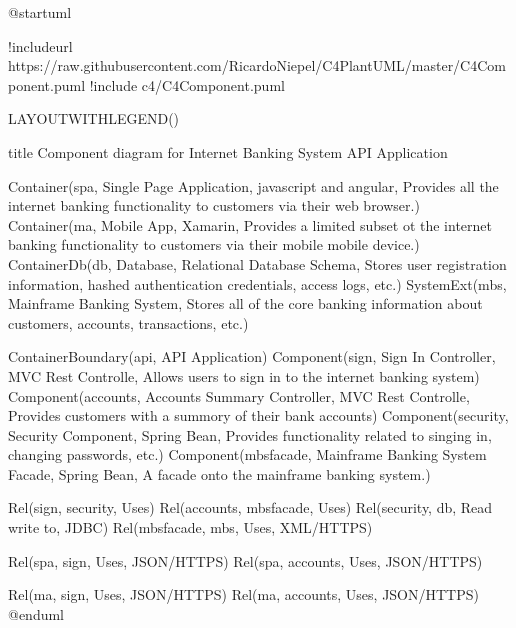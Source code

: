 \documentclass[letterpaper,10pt,english]{sphinxmanual}
\begin{document}
\begin{sphinxVerbatim}[commandchars=\\\{\},numbers=left,firstnumber=1,stepnumber=1]
@startuml

\PYGZsq{}!includeurl https://raw.githubusercontent.com/RicardoNiepel/C4\PYGZhy{}PlantUML/master/C4\PYGZus{}Component.puml
!include \PYGZlt{}c4/C4\PYGZus{}Component.puml\PYGZgt{}  


LAYOUT\PYGZus{}WITH\PYGZus{}LEGEND()


title Component diagram for Internet Banking System \PYGZhy{} API Application

Container(spa, \PYGZdq{}Single Page Application\PYGZdq{}, \PYGZdq{}javascript and angular\PYGZdq{}, \PYGZdq{}Provides all the internet banking functionality to customers via their web browser.\PYGZdq{})
Container(ma, \PYGZdq{}Mobile App\PYGZdq{}, \PYGZdq{}Xamarin\PYGZdq{}, \PYGZdq{}Provides a limited subset ot the internet banking functionality to customers via their mobile mobile device.\PYGZdq{})
ContainerDb(db, \PYGZdq{}Database\PYGZdq{}, \PYGZdq{}Relational Database Schema\PYGZdq{}, \PYGZdq{}Stores user registration information, hashed authentication credentials, access logs, etc.\PYGZdq{})
System\PYGZus{}Ext(mbs, \PYGZdq{}Mainframe Banking System\PYGZdq{}, \PYGZdq{}Stores all of the core banking information about customers, accounts, transactions, etc.\PYGZdq{})

Container\PYGZus{}Boundary(api, \PYGZdq{}API Application\PYGZdq{}) \PYGZob{}
    Component(sign, \PYGZdq{}Sign In Controller\PYGZdq{}, \PYGZdq{}MVC Rest Controlle\PYGZdq{}, \PYGZdq{}Allows users to sign in to the internet banking system\PYGZdq{})
    Component(accounts, \PYGZdq{}Accounts Summary Controller\PYGZdq{}, \PYGZdq{}MVC Rest Controlle\PYGZdq{}, \PYGZdq{}Provides customers with a summory of their bank accounts\PYGZdq{})
    Component(security, \PYGZdq{}Security Component\PYGZdq{}, \PYGZdq{}Spring Bean\PYGZdq{}, \PYGZdq{}Provides functionality related to singing in, changing passwords, etc.\PYGZdq{})
    Component(mbsfacade, \PYGZdq{}Mainframe Banking System Facade\PYGZdq{}, \PYGZdq{}Spring Bean\PYGZdq{}, \PYGZdq{}A facade onto the mainframe banking system.\PYGZdq{})

    Rel(sign, security, \PYGZdq{}Uses\PYGZdq{})
    Rel(accounts, mbsfacade, \PYGZdq{}Uses\PYGZdq{})
    Rel(security, db, \PYGZdq{}Read \PYGZam{} write to\PYGZdq{}, \PYGZdq{}JDBC\PYGZdq{})
    Rel(mbsfacade, mbs, \PYGZdq{}Uses\PYGZdq{}, \PYGZdq{}XML/HTTPS\PYGZdq{})
\PYGZcb{}

Rel(spa, sign, \PYGZdq{}Uses\PYGZdq{}, \PYGZdq{}JSON/HTTPS\PYGZdq{})
Rel(spa, accounts, \PYGZdq{}Uses\PYGZdq{}, \PYGZdq{}JSON/HTTPS\PYGZdq{})

Rel(ma, sign, \PYGZdq{}Uses\PYGZdq{}, \PYGZdq{}JSON/HTTPS\PYGZdq{})
Rel(ma, accounts, \PYGZdq{}Uses\PYGZdq{}, \PYGZdq{}JSON/HTTPS\PYGZdq{})
@enduml
\end{sphinxVerbatim}
\end{document}
